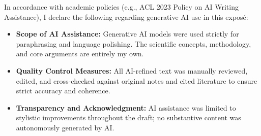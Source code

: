 \documentclass[
    IMRAD=false,
	english,
	ruledheaders=section, %
	class=report, %
	thesis={type=bachelor}, %
	accentcolor=9c, %
	custommargins=false,%
	marginpar=false,%
	parskip=half,%
	fontsize=11pt,%
]{tudapub}
\begin{document}
\label{section:genai}

In accordance with academic policies (e.g., ACL 2023 Policy on AI Writing Assistance), I declare the following regarding generative AI use in this exposé:

\begin{itemize}
    \item \textbf{Scope of AI Assistance:} Generative AI models were used strictly for paraphrasing and language polishing. The scientific concepts, methodology, and core arguments are entirely my own.
    \item \textbf{Quality Control Measures:} All AI-refined text was manually reviewed, edited, and cross-checked against original notes and cited literature to ensure strict accuracy and coherence.
    \item \textbf{Transparency and Acknowledgment:} AI assistance was limited to stylistic improvements throughout the draft; no substantive content was autonomously generated by AI.
\end{itemize}




\end{document}
